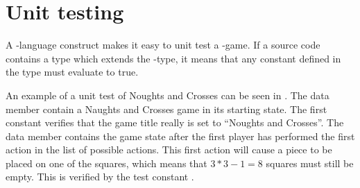 

\section{Unit testing}
A \productname{}-language construct makes it easy to unit test a \productname{}-game.
If a source code contains a type which extends the -type, it means that any constant defined in the type must evaluate to true.

An example of a unit test of Noughts and Crosses can be seen in .
The data member  contain a Naughts and Crosses game in its starting state.
The first constant  verifies that the game title really is set to ``Noughts and Crosses''.
The data member  contains the game state after the first player has 
performed the first action in the list of possible actions. This first action will cause a piece to be placed on one of the squares, which means 
that $3*3 - 1 = 8$ squares must still be empty. This is verified by the test constant .


